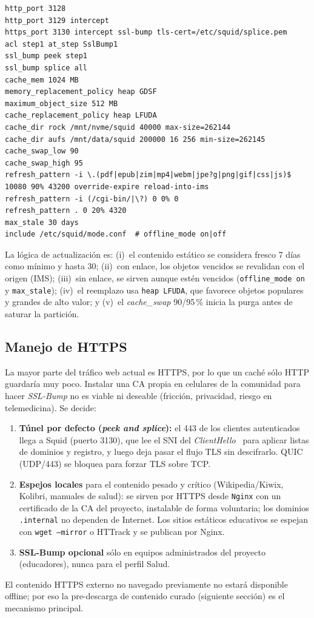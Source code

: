 \documentclass[conference]{IEEEtran}
\begin{document}
\begin{lstlisting}
http_port 3128
http_port 3129 intercept
https_port 3130 intercept ssl-bump tls-cert=/etc/squid/splice.pem
acl step1 at_step SslBump1
ssl_bump peek step1
ssl_bump splice all
cache_mem 1024 MB
memory_replacement_policy heap GDSF
maximum_object_size 512 MB
cache_replacement_policy heap LFUDA
cache_dir rock /mnt/nvme/squid 40000 max-size=262144
cache_dir aufs /mnt/data/squid 200000 16 256 min-size=262145
cache_swap_low 90
cache_swap_high 95
refresh_pattern -i \.(pdf|epub|zim|mp4|webm|jpe?g|png|gif|css|js)$ 10080 90% 43200 override-expire reload-into-ims
refresh_pattern -i (/cgi-bin/|\?) 0 0% 0
refresh_pattern . 0 20% 4320
max_stale 30 days
include /etc/squid/mode.conf  # offline_mode on|off
\end{lstlisting}

La lógica de actualización es: (i)~el contenido estático se considera fresco 7 días como mínimo y hasta 30; (ii)~con enlace, los objetos vencidos se revalidan con el origen (IMS); (iii)~sin enlace, se sirven aunque estén vencidos (\texttt{offline\_mode on} y \texttt{max\_stale}); (iv)~el reemplazo usa \texttt{heap LFUDA}, que favorece objetos populares y grandes de alto valor; y (v)~el \textit{cache\_swap} 90/95\,\% inicia la purga antes de saturar la partición.

\subsection{Manejo de HTTPS}\label{sec:https}
La mayor parte del tráfico web actual es HTTPS, por lo que un caché sólo HTTP guardaría muy poco. Instalar una CA propia en celulares de la comunidad para hacer \textit{SSL-Bump} no es viable ni deseable (fricción, privacidad, riesgo en telemedicina). Se decide:
\begin{enumerate}
  \item \textbf{Túnel por defecto (\textit{peek and splice}):} el 443 de los clientes autenticados llega a Squid (puerto 3130), que lee el SNI del \textit{ClientHello}~\cite{sslpeek} para aplicar listas de dominios y registro, y luego deja pasar el flujo TLS sin descifrarlo. QUIC (UDP/443) se bloquea para forzar TLS sobre TCP.
  \item \textbf{Espejos locales} para el contenido pesado y crítico (Wikipedia/Kiwix, Kolibri, manuales de salud): se sirven por HTTPS desde \texttt{Nginx} con un certificado de la CA del proyecto, instalable de forma voluntaria; los dominios \texttt{.internal} no dependen de Internet. Los sitios estáticos educativos se espejan con \texttt{wget --mirror} o HTTrack y se publican por Nginx.
  \item \textbf{SSL-Bump opcional} sólo en equipos administrados del proyecto (educadores), nunca para el perfil Salud.
\end{enumerate}
El contenido HTTPS externo no navegado previamente no estará disponible offline; por eso la pre-descarga de contenido curado (siguiente sección) es el mecanismo principal.
\end{document}
